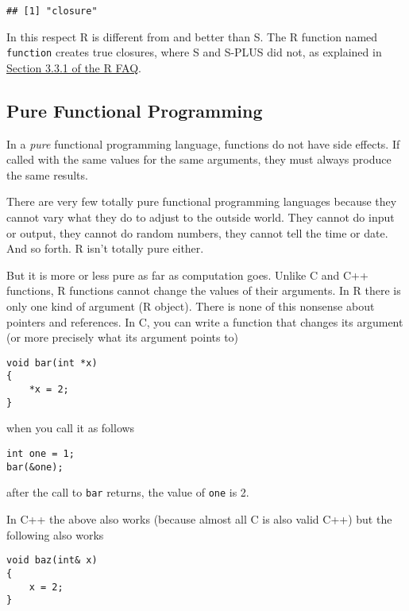 \documentclass[
]{article}
\begin{document}
\begin{verbatim}
## [1] "closure"
\end{verbatim}

In this respect R is different from and better than S. The R function
named \texttt{function} creates true closures, where S and S-PLUS did
not, as explained in
\href{https://cloud.r-project.org/doc/FAQ/R-FAQ.html\#Lexical-scoping}{Section
3.3.1 of the R FAQ}.

\hypertarget{pure-functional-programming}{%
\subsection{Pure Functional
Programming}\label{pure-functional-programming}}

In a \emph{pure} functional programming language, functions do not have
side effects. If called with the same values for the same arguments,
they must always produce the same results.

There are very few totally pure functional programming languages because
they cannot vary what they do to adjust to the outside world. They
cannot do input or output, they cannot do random numbers, they cannot
tell the time or date. And so forth. R isn't totally pure either.

But it is more or less pure as far as computation goes. Unlike C and C++
functions, R functions cannot change the values of their arguments. In R
there is only one kind of argument (R object). There is none of this
nonsense about pointers and references. In C, you can write a function
that changes its argument (or more precisely what its argument points
to)

\begin{verbatim}
void bar(int *x)
{
    *x = 2;
}
\end{verbatim}

when you call it as follows

\begin{verbatim}
int one = 1;
bar(&one);
\end{verbatim}

after the call to \texttt{bar} returns, the value of \texttt{one} is 2.

In C++ the above also works (because almost all C is also valid C++) but
the following also works

\begin{verbatim}
void baz(int& x)
{
    x = 2;
}
\end{verbatim}
\end{document}
